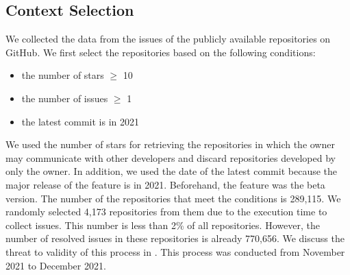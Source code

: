 \subsection{Context Selection}
We collected the data from the issues of 
the publicly available repositories on GitHub. 
We first select the repositories based on the following conditions:
\begin{itemize}
	\item the number of stars $\geq$ 10
	\item the number of issues $\geq$ 1
	\item the latest commit is in 2021
\end{itemize}
We used the number of stars for retrieving the repositories 
in which the owner may communicate with other developers and 
discard repositories developed by only the owner. 
In addition, we used the date of the latest commit 
because the major release of the feature is in 2021. 
Beforehand, the feature was the beta version. 
The number of the repositories that meet 
the conditions is 289,115. 
We randomly selected 4,173 repositories from them 
due to the execution time to collect issues. 
This number is less than 2\% of all repositories. 
However, the number of resolved issues 
in these repositories is already 770,656. 
We discuss the threat to validity of 
this process in . 
This process was conducted from November 2021 to December 2021.



